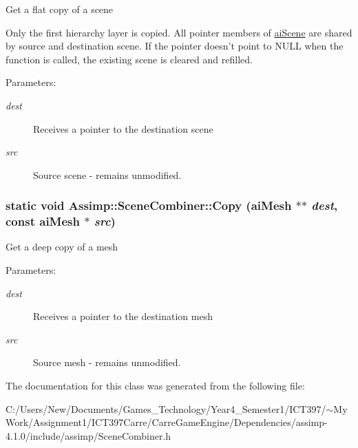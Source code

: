Get a flat copy of a scene

Only the first hierarchy layer is copied. All pointer members of \hyperlink{structai_scene}{aiScene} are shared by source and destination scene. If the pointer doesn't point to NULL when the function is called, the existing scene is cleared and refilled. \begin{Desc}
\item[Parameters:]
\begin{description}
\item[{\em dest}]Receives a pointer to the destination scene \item[{\em src}]Source scene - remains unmodified. \end{description}
\end{Desc}
\hypertarget{class_assimp_1_1_scene_combiner_abed196fdfb16f82873ec811c6a64bfc}{
\subsubsection[Copy]{\setlength{\rightskip}{0pt plus 5cm}static void Assimp::SceneCombiner::Copy ({\bf aiMesh} $\ast$$\ast$ {\em dest}, \/  const {\bf aiMesh} $\ast$ {\em src})}}
\label{class_assimp_1_1_scene_combiner_abed196fdfb16f82873ec811c6a64bfc}


Get a deep copy of a mesh

\begin{Desc}
\item[Parameters:]
\begin{description}
\item[{\em dest}]Receives a pointer to the destination mesh \item[{\em src}]Source mesh - remains unmodified. \end{description}
\end{Desc}


The documentation for this class was generated from the following file:\begin{CompactItemize}
\item 
C:/Users/New/Documents/Games\_\-Technology/Year4\_\-Semester1/ICT397/$\sim$My Work/Assignment1/ICT397Carre/CarreGameEngine/Dependencies/assimp-4.1.0/include/assimp/SceneCombiner.h\end{CompactItemize}
